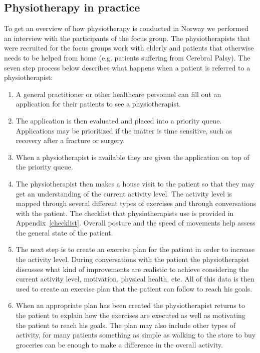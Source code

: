 \subsection{Physiotherapy in practice} 
\label{sec:physiotherapyPractice}
To get an overview of how physiotherapy is conducted in Norway we performed an interview with the participants of the focus group. The physiotherapists that were recruited for the focus groups work with elderly and patients that otherwise needs to be helped from home (e.g. patients suffering from Cerebral Palsy). The seven step process below describes what happens when a patient is referred to a physiotherapist:

\vspace{-4mm}
\begin{enumerate}
  \item A general practitioner or other healthcare personnel can fill out an application for their patients to see a physiotherapist.
  \item The application is then evaluated and placed into a priority queue. Applications may be prioritized if the matter is time sensitive, such as recovery after a fracture or surgery.
  \item When a physiotherapist is available they are given the application on top of the priority queue.
  \item The physiotherapist then makes a house visit to the patient so that they may get an understanding of the current activity level. The activity level is mapped through several different types of exercises and through conversations with the patient. The checklist that physiotherapists use is provided in Appendix~\ref{checklist}. Overall posture and the speed of movements help assess the general state of the patient.
  \item The next step is to create an exercise plan for the patient in order to increase the activity level. During conversations with the patient the physiotherapist discusses what kind of improvements are realistic to achieve considering the current activity level, motivation, physical health, etc. All of this data is then used to create an exercise plan that the patient can follow to reach his goals.
  \item When an appropriate plan has been created the physiotherapist returns to the patient to explain how the exercises are executed as well as motivating the patient to reach his goals. The plan may also include other types of activity, for many patients something as simple as walking to the store to buy groceries can be enough to make a difference in the overall activity.

\end{enumerate}
